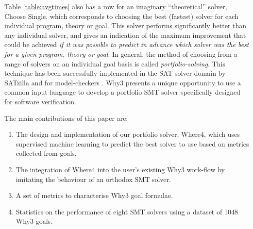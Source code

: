 \documentclass[submission,copyright,creativecommons]{eptcs}
\begin{document}
Table \ref{table:avgtimes} also has a row for an imaginary ``theoretical'' solver, \textsf{Choose Single}, which corresponds to choosing the best (fastest) solver for each individual program, theory or goal.  This solver performs significantly better than any individual solver, and gives an indication of the maximum improvement that could be achieved \textit{if it was possible to predict in advance which solver was the best for a given program, theory or goal}.  In general, the method of choosing from a range of solvers on an individual goal basis is called \textit{portfolio-solving}. This technique has been successfully implemented in the SAT solver domain by SATzilla \cite{Satzilla} and for model-checkers \cite{DPVZ15:CAV}\cite{MUX}. \textsf{Why3} presents a unique opportunity to use a common input language to develop a portfolio SMT solver specifically designed for software verification.  

The main contributions of this paper are:
\begin{enumerate}
\item The design  and implementation of our portfolio solver, \textsf{Where4}, which uses supervised machine learning to predict the best solver to use based on metrics collected from goals.
\item The integration of \textsf{Where4} into the user's existing \textsf{Why3} work-flow by imitating the behaviour of an orthodox SMT solver.
\item A set of metrics to characterise \textsf{Why3} goal formulae.
\item Statistics on the performance of eight SMT solvers using a dataset of 1048 \textsf{Why3} goals.

\end{enumerate}
\end{document}
